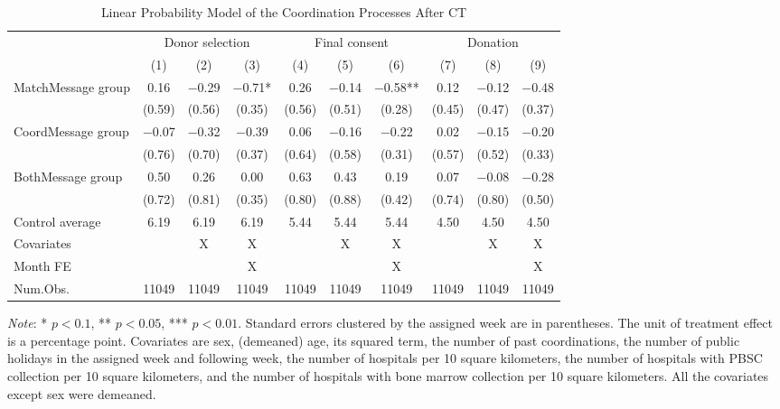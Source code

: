 \documentclass[12pt, a4paper]{article}
\begin{document}
\begin{table}[H]
\centering\centering
\caption{\label{tab:lm-coordinate}Linear Probability Model of the Coordination Processes After CT}
\centering
\fontsize{8}{10}\selectfont
\begin{threeparttable}
\begin{tabular}[t]{lccccccccc}
\toprule
\multicolumn{1}{c}{ } & \multicolumn{3}{c}{Donor selection} & \multicolumn{3}{c}{Final consent} & \multicolumn{3}{c}{Donation} \\
\cmidrule(l{3pt}r{3pt}){2-4} \cmidrule(l{3pt}r{3pt}){5-7} \cmidrule(l{3pt}r{3pt}){8-10}
  & (1) & (2) & (3) & (4) & (5) & (6) & (7) & (8) & (9)\\
\midrule
MatchMessage group & \num{0.16} & \num{-0.29} & \num{-0.71}* & \num{0.26} & \num{-0.14} & \num{-0.58}** & \num{0.12} & \num{-0.12} & \num{-0.48}\\
 & (\num{0.59}) & (\num{0.56}) & (\num{0.35}) & (\num{0.56}) & (\num{0.51}) & (\num{0.28}) & (\num{0.45}) & (\num{0.47}) & (\num{0.37})\\
CoordMessage group & \num{-0.07} & \num{-0.32} & \num{-0.39} & \num{0.06} & \num{-0.16} & \num{-0.22} & \num{0.02} & \num{-0.15} & \num{-0.20}\\
 & (\num{0.76}) & (\num{0.70}) & (\num{0.37}) & (\num{0.64}) & (\num{0.58}) & (\num{0.31}) & (\num{0.57}) & (\num{0.52}) & (\num{0.33})\\
BothMessage group & \num{0.50} & \num{0.26} & \num{0.00} & \num{0.63} & \num{0.43} & \num{0.19} & \num{0.07} & \num{-0.08} & \num{-0.28}\\
 & (\num{0.72}) & (\num{0.81}) & (\num{0.35}) & (\num{0.80}) & (\num{0.88}) & (\num{0.42}) & (\num{0.74}) & (\num{0.80}) & (\num{0.50})\\
\midrule
Control average & 6.19 & 6.19 & 6.19 & 5.44 & 5.44 & 5.44 & 4.50 & 4.50 & 4.50\\
Covariates &  & X & X &  & X & X &  & X & X\\
Month FE &  &  & X &  &  & X &  &  & X\\
Num.Obs. & \num{11049} & \num{11049} & \num{11049} & \num{11049} & \num{11049} & \num{11049} & \num{11049} & \num{11049} & \num{11049}\\
\bottomrule
\end{tabular}
\begin{tablenotes}
\item \emph{Note}: * $p < 0.1$, ** $p < 0.05$, *** $p < 0.01$. Standard errors clustered by the assigned week are in parentheses. The unit of treatment effect is a percentage point. Covariates are sex, (demeaned) age, its squared term, the number of past coordinations, the number of public holidays in the assigned week and following week, the number of hospitals per 10 square kilometers, the number of hospitals with PBSC collection per 10 square kilometers, and the number of hospitals with bone marrow collection per 10 square kilometers. All the covariates except sex were demeaned.
\end{tablenotes}
\end{threeparttable}
\end{table}
\end{document}
